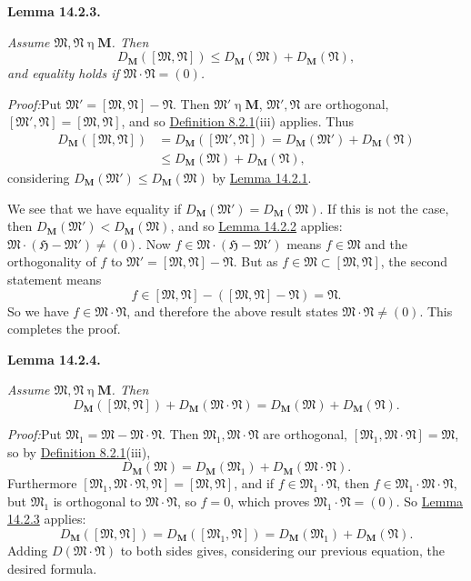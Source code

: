 \documentclass[12pt,b5paper,twoside]{article}
\newcommand{\Hspace}{\mathfrak H}
\newcommand{\M}{\mathbf M}
\newcommand{\Lemma}[1]{%
  \par\smallskip\noindent\phantomsection\label{lem:#1}\textbf{Lemma #1.}\enspace
}
\newcommand{\Proof}{\par\noindent\textit{Proof:}\enspace}
\newcommand{\defref}[1]{\hyperref[def:#1]{Definition #1}}
\newcommand{\lemref}[1]{\hyperref[lem:#1]{Lemma #1}}
\begin{document}
\Lemma{14.2.3}
{\itshape Assume \(\mathfrak M,\mathfrak N\mathbin\eta\M\). Then
\[
 D_{\M}([\mathfrak M,\mathfrak N])
 \leq D_{\M}(\mathfrak M)+D_{\M}(\mathfrak N),
\]
and equality holds if \(\mathfrak M\cdot\mathfrak N=(0)\).}

\Proof Put \(\mathfrak M'=[\mathfrak M,\mathfrak N]-\mathfrak N\). Then
\(\mathfrak M'\mathbin\eta\M\), \(\mathfrak M',\mathfrak N\) are
orthogonal, \([\mathfrak M',\mathfrak N]=[\mathfrak M,\mathfrak N]\), and
so \defref{8.2.1}(iii) applies. Thus
\[
\begin{aligned}
D_{\M}([\mathfrak M,\mathfrak N])
 &=D_{\M}([\mathfrak M',\mathfrak N])
  =D_{\M}(\mathfrak M')+D_{\M}(\mathfrak N)\\
 &\leq D_{\M}(\mathfrak M)+D_{\M}(\mathfrak N),
\end{aligned}
\]
considering \(D_{\M}(\mathfrak M')\leq D_{\M}(\mathfrak M)\) by
\lemref{14.2.1}.

We see that we have equality if
\(D_{\M}(\mathfrak M')=D_{\M}(\mathfrak M)\). If this is not the case, then
\(D_{\M}(\mathfrak M')<D_{\M}(\mathfrak M)\), and so \lemref{14.2.2}
applies: \(\mathfrak M\cdot(\Hspace-\mathfrak M')\ne(0)\). Now
\(f\in\mathfrak M\cdot(\Hspace-\mathfrak M')\) means
\(f\in\mathfrak M\) and the orthogonality of \(f\) to
\(\mathfrak M'=[\mathfrak M,\mathfrak N]-\mathfrak N\). But as
\(f\in\mathfrak M\subset[\mathfrak M,\mathfrak N]\), the second statement
means
\[
 f\in[\mathfrak M,\mathfrak N]
  -([\mathfrak M,\mathfrak N]-\mathfrak N)=\mathfrak N.
\]
So we have \(f\in\mathfrak M\cdot\mathfrak N\), and therefore the above
result states \(\mathfrak M\cdot\mathfrak N\ne(0)\). This completes the proof.

\Lemma{14.2.4}
{\itshape Assume \(\mathfrak M,\mathfrak N\mathbin\eta\M\). Then
\[
 D_{\M}([\mathfrak M,\mathfrak N])
 +D_{\M}(\mathfrak M\cdot\mathfrak N)
 =D_{\M}(\mathfrak M)+D_{\M}(\mathfrak N).
\]}

\Proof Put \(\mathfrak M_1=\mathfrak M-\mathfrak M\cdot\mathfrak N\).
Then \(\mathfrak M_1,\mathfrak M\cdot\mathfrak N\) are orthogonal,
\([\mathfrak M_1,\mathfrak M\cdot\mathfrak N]=\mathfrak M\), so by
\defref{8.2.1}(iii),
\[
D_{\M}(\mathfrak M)=D_{\M}(\mathfrak M_1)
 +D_{\M}(\mathfrak M\cdot\mathfrak N).
\]
Furthermore \([\mathfrak M_1,\mathfrak M\cdot\mathfrak N,\mathfrak N]
=[\mathfrak M,\mathfrak N]\), and if
\(f\in\mathfrak M_1\cdot\mathfrak N\), then
\(f\in\mathfrak M_1\cdot\mathfrak M\cdot\mathfrak N\), but
\(\mathfrak M_1\) is orthogonal to
\(\mathfrak M\cdot\mathfrak N\), so \(f=0\), which proves
\(\mathfrak M_1\cdot\mathfrak N=(0)\). So \lemref{14.2.3} applies:
\[
D_{\M}([\mathfrak M,\mathfrak N])
=D_{\M}([\mathfrak M_1,\mathfrak N])
=D_{\M}(\mathfrak M_1)+D_{\M}(\mathfrak N).
\]
Adding \(D(\mathfrak M\cdot\mathfrak N)\) to both sides gives,
considering our previous equation, the desired formula.
\end{document}
